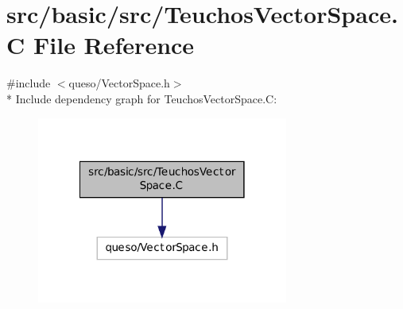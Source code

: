\hypertarget{_teuchos_vector_space_8_c}{\section{src/basic/src/\-Teuchos\-Vector\-Space.C File Reference}
\label{_teuchos_vector_space_8_c}
}
{\ttfamily \#include $<$queso/\-Vector\-Space.\-h$>$}\\*
Include dependency graph for Teuchos\-Vector\-Space.\-C\-:
\nopagebreak
\begin{figure}[H]
\begin{center}
\leavevmode
\includegraphics[width=234pt]{_teuchos_vector_space_8_c__incl}
\end{center}
\end{figure}
